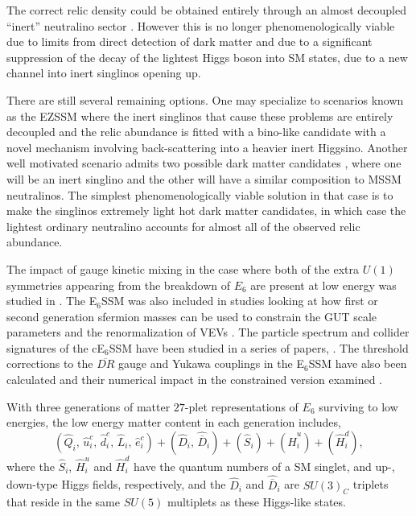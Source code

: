 \documentclass[preprint,amsmath,amssymb,aps,superscriptaddress,prd,showpacs,floatfix,nofootinbib]{revtex4-1}
\newcommand{\be}{\begin{equation}}
\newcommand{\ee}{\end{equation}}
\begin{document}
The correct relic density could be obtained entirely through an almost
decoupled ``inert'' neutralino sector \cite{Hall:2009aj}.  However
this is no longer phenomenologically viable due to limits from direct
detection of dark matter
\cite{2011PhRvL.107m1302A,2012PhRvL.109r1301A, Akerib:2013tjd} and due
to a significant suppression of the decay of the lightest Higgs boson
into SM states, due to a new channel into inert singlinos opening up.

There are still several remaining options. One may specialize to
scenarios known as the EZSSM \cite{Hall:2011zq} where the inert
singlinos that cause these problems are entirely decoupled and the
relic abundance is fitted with a bino-like candidate with a novel
mechanism involving back-scattering into a heavier inert
Higgsino. Another well motivated scenario admits two possible dark
matter candidates \cite{Nevzorov:2012hs}, where one will be an inert
singlino and the other will have a similar composition to MSSM
neutralinos. The simplest phenomenologically viable solution in that
case is to make the singlinos extremely light hot dark matter
candidates, in which case the lightest ordinary neutralino accounts
for almost all of the observed relic abundance.

The impact of gauge kinetic mixing in the case where both of the extra
$U(1)$ symmetries appearing from the breakdown of $E_6$ are present at
low energy was studied in \cite{Rizzo:2012rf}.  The E$_6$SSM was also
included in studies looking at how first or second generation sfermion
masses can be used to constrain the GUT scale parameters
\cite{Miller:2012vn} and the renormalization of VEVs
\cite{Sperling:2013eva, Sperling:2013xqa}.  The particle spectrum and
collider signatures of the cE$_6$SSM have been studied in a series of
papers,
\cite{Athron:2009ue,Athron:2009bs,Athron:2011wu,Athron:2012sq}. The
threshold corrections to the $\overline{DR}$ gauge and Yukawa
couplings in the E$_6$SSM have also been calculated and their
numerical impact in the constrained version examined
\cite{Athron:2012pw}.


With three generations of matter $27$-plet representations of $E_6$
surviving to low energies, the low energy matter content in each generation 
includes, \be
(\hat{Q}_i,\,\hat{u}^c_i,\,\hat{d}^c_i,\,\hat{L}_i,\,\hat{e}^c_i)
+(\hat{D}_i,\,\hat{\overline{D}}_i)+(\hat{S}_{i})+(\hat{H}^u_i)+(\hat{H}^d_i),\ee
where the $\hat{S}_{i}$, $\hat{H}^u_i$ and $\hat{H}^d_i$ have the quantum numbers of a
SM singlet, and up-, down-type Higgs fields, respectively, and the $\hat{D}_i$ and
$\hat{\overline{D}}_i$ are $SU(3)_C$ triplets that reside in the
same $SU(5)$ multiplets as these Higgs-like states.
\end{document}
